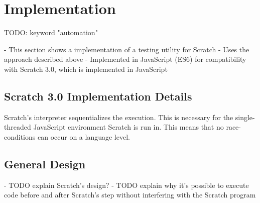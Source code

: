 







\chapter{Implementation}

TODO: keyword "automation"

- This section shows a implementation of a testing utility for Scratch
- Uses the approach described above
- Implemented in JavaScript (ES6) for compatibility with Scratch 3.0, which is implemented in JavaScript

\section {Scratch 3.0 Implementation Details}

Scratch's interpreter sequentializes the execution.
This is necessary for the single-threaded JavaScript environment Scratch is run in.
This means that no race-conditions can occur on a language level.

\section{General Design}

- TODO explain Scratch's design?
- TODO explain why it's possible to execute code before and after Scratch's step without interfering with the Scratch program

